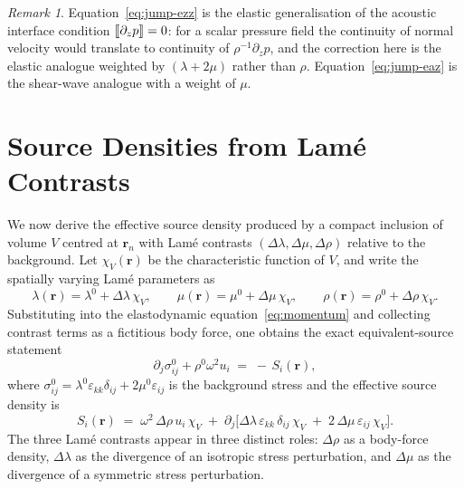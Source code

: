 \documentclass[11pt,a4paper]{article}
\newcommand{\eps}{\varepsilon}
\newcommand{\rrn}{\bm{r}_n}
\newcommand{\jump}[1]{\left[\kern-1.5pt\left[#1\right]\kern-1.5pt\right]}
\theoremstyle{plain}
\theoremstyle{definition}
\theoremstyle{remark}
\newtheorem{remark}[proposition]{Remark}
\begin{document}
\begin{remark}
Equation~\eqref{eq:jump-ezz} is the elastic generalisation of the
acoustic interface condition $\jump{\partial_z p}=0$: for a scalar
pressure field the continuity of normal velocity would translate to
continuity of $\rho^{-1}\partial_z p$, and the correction here is the
elastic analogue weighted by $(\lambda+2\mu)$ rather than $\rho$.
Equation~\eqref{eq:jump-eaz} is the shear-wave analogue with a weight
of $\mu$.
\end{remark}

\section{Source Densities from Lam\'e Contrasts}\label{sec:sources}
We now derive the effective source density produced by a compact
inclusion of volume $V$ centred at $\rrn$ with Lam\'e contrasts
$(\Delta\lambda,\Delta\mu,\Delta\rho)$ relative to the background.
Let $\chi_V(\bm{r})$ be the characteristic function of $V$, and write
the spatially varying Lam\'e parameters as
\begin{equation}
  \lambda(\bm{r})=\lambda^0+\Delta\lambda\,\chi_V,
  \qquad
  \mu(\bm{r})=\mu^0+\Delta\mu\,\chi_V,
  \qquad
  \rho(\bm{r})=\rho^0+\Delta\rho\,\chi_V.
\end{equation}
Substituting into the elastodynamic equation~\eqref{eq:momentum} and
collecting contrast terms as a fictitious body force, one obtains the
exact equivalent-source statement
\begin{equation}
  \partial_j\sigma_{ij}^{0} + \rho^0\omega^2 u_i
  \;=\;
  -\,S_i(\bm{r}),
  \label{eq:born-full}
\end{equation}
where $\sigma_{ij}^{0}=\lambda^0\eps_{kk}\delta_{ij}+2\mu^0\eps_{ij}$ is
the background stress and the effective source density is
\begin{equation}
  S_i(\bm{r})
  \;=\;
  \omega^2\,\Delta\rho\,u_i\,\chi_V
  \;+\;
  \partial_j\!\bigl[
    \Delta\lambda\,\eps_{kk}\,\delta_{ij}\,\chi_V
    \;+\;
    2\,\Delta\mu\,\eps_{ij}\,\chi_V
  \bigr].
  \label{eq:born-source}
\end{equation}
The three Lam\'e contrasts appear in three distinct roles:
$\Delta\rho$ as a body-force density, $\Delta\lambda$ as the divergence
of an isotropic stress perturbation, and $\Delta\mu$ as the divergence
of a symmetric stress perturbation.
\end{document}
